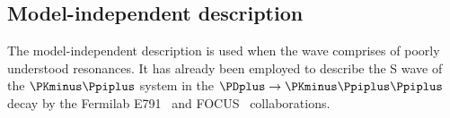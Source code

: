 \documentclass[
	10pt,
	twoside,
	openright,
]{scrbook}
\begin{document}
    \subsection{Model-independent description}

    The model-independent description is used when the wave comprises of poorly understood resonances.
    It has already been employed to describe the S wave of the $\PKminus\Ppiplus$ system in the $\PDplus \to \PKminus\Ppiplus\Ppiplus$ decay by the Fermilab E791~\cite{PhysRevD.73.032004} and FOCUS~\cite{Link200914} collaborations.

%
\backmatter
	\printnoidxglossaries

	\cleardoublepage
	\printindex

	\cleardoublepage
	\nocite{*}
	\printbibliography
\end{document}
